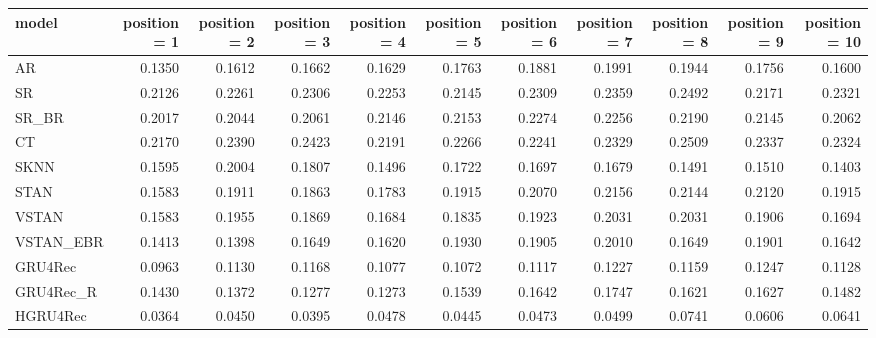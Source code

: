 \begin{tabular}{lrrrrrrrrrr}
\toprule
     model &  position = 1 &  position = 2 &  position = 3 &  position = 4 &  position = 5 &  position = 6 &  position = 7 &  position = 8 &  position = 9 &  position = 10 \\
\midrule
        AR &        0.1350 &        0.1612 &        0.1662 &        0.1629 &        0.1763 &        0.1881 &        0.1991 &        0.1944 &        0.1756 &         0.1600 \\
        SR &        0.2126 &        0.2261 &        0.2306 &        0.2253 &        0.2145 &        0.2309 &        0.2359 &        0.2492 &        0.2171 &         0.2321 \\
     SR\_BR &        0.2017 &        0.2044 &        0.2061 &        0.2146 &        0.2153 &        0.2274 &        0.2256 &        0.2190 &        0.2145 &         0.2062 \\
        CT &        0.2170 &        0.2390 &        0.2423 &        0.2191 &        0.2266 &        0.2241 &        0.2329 &        0.2509 &        0.2337 &         0.2324 \\
      SKNN &        0.1595 &        0.2004 &        0.1807 &        0.1496 &        0.1722 &        0.1697 &        0.1679 &        0.1491 &        0.1510 &         0.1403 \\
      STAN &        0.1583 &        0.1911 &        0.1863 &        0.1783 &        0.1915 &        0.2070 &        0.2156 &        0.2144 &        0.2120 &         0.1915 \\
     VSTAN &        0.1583 &        0.1955 &        0.1869 &        0.1684 &        0.1835 &        0.1923 &        0.2031 &        0.2031 &        0.1906 &         0.1694 \\
 VSTAN\_EBR &        0.1413 &        0.1398 &        0.1649 &        0.1620 &        0.1930 &        0.1905 &        0.2010 &        0.1649 &        0.1901 &         0.1642 \\
   GRU4Rec &        0.0963 &        0.1130 &        0.1168 &        0.1077 &        0.1072 &        0.1117 &        0.1227 &        0.1159 &        0.1247 &         0.1128 \\
 GRU4Rec\_R &        0.1430 &        0.1372 &        0.1277 &        0.1273 &        0.1539 &        0.1642 &        0.1747 &        0.1621 &        0.1627 &         0.1482 \\
  HGRU4Rec &        0.0364 &        0.0450 &        0.0395 &        0.0478 &        0.0445 &        0.0473 &        0.0499 &        0.0741 &        0.0606 &         0.0641 \\
\bottomrule
\end{tabular}
